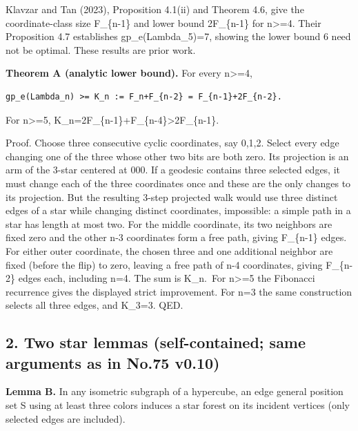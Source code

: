 \documentclass[
  10pt,
]{article}
\begin{document}
Klavzar and Tan (2023), Proposition 4.1(ii) and Theorem 4.6, give the
coordinate-class size F\_\{n-1\} and lower bound 2F\_\{n-1\} for
n\textgreater=4. Their Proposition 4.7 establishes gp\_e(Lambda\_5)=7,
showing the lower bound 6 need not be optimal. These results are prior
work.

\textbf{Theorem A (analytic lower bound).} For every n\textgreater=4,

\begin{verbatim}
gp_e(Lambda_n) >= K_n := F_n+F_{n-2} = F_{n-1}+2F_{n-2}.
\end{verbatim}

For n\textgreater=5, K\_n=2F\_\{n-1\}+F\_\{n-4\}\textgreater2F\_\{n-1\}.

Proof. Choose three consecutive cyclic coordinates, say 0,1,2. Select
every edge changing one of the three whose other two bits are both zero.
Its projection is an arm of the 3-star centered at 000. If a geodesic
contains three selected edges, it must change each of the three
coordinates once and these are the only changes to its projection. But
the resulting 3-step projected walk would use three distinct edges of a
star while changing distinct coordinates, impossible: a simple path in a
star has length at most two. For the middle coordinate, its two
neighbors are fixed zero and the other n-3 coordinates form a free path,
giving F\_\{n-1\} edges. For either outer coordinate, the chosen three
and one additional neighbor are fixed (before the flip) to zero, leaving
a free path of n-4 coordinates, giving F\_\{n-2\} edges each, including
n=4. The sum is K\_n.~For n\textgreater=5 the Fibonacci recurrence gives
the displayed strict improvement. For n=3 the same construction selects
all three edges, and K\_3=3. QED.

\subsection{2. Two star lemmas (self-contained; same arguments as in
No.75
v0.10)}\label{two-star-lemmas-self-contained-same-arguments-as-in-no.75-v0.10}

\textbf{Lemma B.} In any isometric subgraph of a hypercube, an edge
general position set S using at least three colors induces a star forest
on its incident vertices (only selected edges are included).
\end{document}
